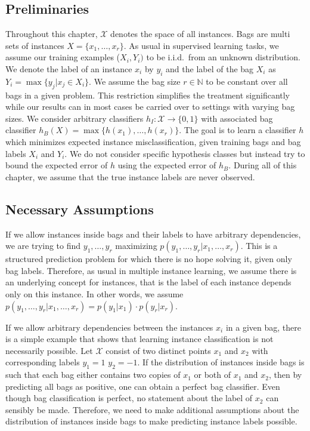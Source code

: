 \subsection{Preliminaries}
Throughout this chapter, $\mathcal{X}$ denotes the space of all instances. Bags
are multi sets of instances $X=\{x_1,\dotsc, x_r\}$.  As usual in supervised
learning tasks, we assume our training examples ($X_i,Y_i)$ to be i.i.d.\ from
an unknown distribution.  We denote the label of an instance $x_i$ by $y_i$ and
the label of the bag $X_i$ as $Y_i = \max\{y_j | x_j \in  X_i\}$.  We assume
the bag size $r\in \mathbb{N}$ to be constant over all bags in a given problem.
This restriction simplifies the treatment significantly while our results can
in most cases be carried over to settings with varying bag sizes.  We consider
arbitrary classifiers $h_I\colon \mathcal{X} \rightarrow \{0, 1\}$ with
associated bag classifier $h_B(X) = \max \{h(x_1),\dotsc,h(x_r)\}$.  The goal
is to learn a classifier $h$ which minimizes expected instance
misclassification, given training bags and bag labels $X_i$ and $Y_i$.  We do
not consider specific hypothesis classes but instead try to bound the expected
error of $h$ using the expected error of $h_B$.  During all of this chapter, we
assume that the true instance labels are never observed.

\subsection{Necessary Assumptions}
If we allow instances inside bags and their labels to have arbitrary
dependencies, we are trying to find $y_1,\dotsc,y_r$ maximizing $p(y_1,\dotsc,
y_r | x_1, \dotsc, x_r)$. This is a structured prediction problem for which
there is no hope solving it, given only bag labels. Therefore, as usual in
multiple instance learning, we assume there is an underlying concept for
instances, that is the label of each instance depends only on this instance.
In other words, we assume $p(y_1,\dotsc, y_r | x_1, \dotsc, x_r)=p(y_1|x_1)
\cdot p(y_r|x_r)$.

If we allow arbitrary dependencies between the instances $x_i$ in a given bag,
there is a simple example \citep{sabato2009homogeneous} that shows that
learning instance classification is not necessarily possible. Let
$\mathcal{X}$ consist of two distinct points $x_1$ and $x_2$ with corresponding
labels $y_1 = 1$ $y_2 = -1$. If the distribution of instances inside bags is
such that each bag either contains two copies of $x_1$ or both of $x_1$ and
$x_2$, then by predicting all bags as positive, one can obtain a perfect bag
classifier. Even though bag classification is perfect, no statement about the
label of $x_2$ can sensibly be made.
Therefore, we need to make additional assumptions about the distribution of
instances inside bags to make predicting instance labels possible.


